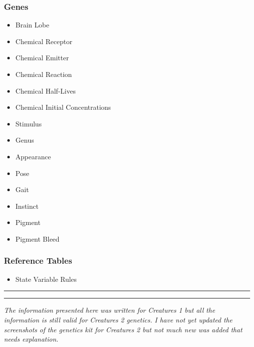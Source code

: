 \documentclass[11pt,twoside,a4paper]{article}
\begin{document}
\begin{minipage}{0.5\linewidth}
			\subsubsection{Genes}
			\begin{itemize}
				\item Brain Lobe
				\item Chemical Receptor
				\item Chemical Emitter
				\item Chemical Reaction
				\item Chemical Half-Lives
				\item Chemical Initial Concentrations
				\item Stimulus
				\item Genus
				\item Appearance
				\item Pose
				\item Gait
				\item Instinct
				\item Pigment
				\item Pigment Bleed
			\end{itemize}
\end{minipage}
\begin{minipage}{0.1\linewidth}\end{minipage}
\begin{minipage}{0.4\linewidth}
			\subsubsection{Reference Tables}
			\begin{itemize}
				\item State Variable Rules
			\end{itemize}
			
			\rule{3cm}{0.25mm}
			
			\rule{3cm}{0.25mm}
			
			\emph{The information presented here was written for Creatures 1 but all the information is still valid for Creatures 2 genetics. I have not yet updated the screenshots of the genetics kit for Creatures 2 but not much new was added that needs explanation.}
\end{minipage}
\end{document}
